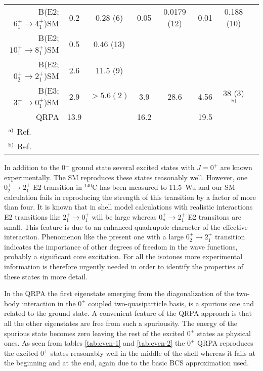 \begin{table}[htbp]
\begin{center}
\begin{tabular}{rccccccc}
B(E2;$6^{+}_{1} \rightarrow 4^{+}_{1}$)\hspace{1.cm}SM & 0.2  & 0.28 (6) & 0.05 & 
                           0.0179 (12) & 0.01 & 0.188 (10) \\
B(E2;$10^{+}_{1} \rightarrow 8^{+}_{1}$)\hspace{.85cm}SM & 0.5 & 0.46 (13) & & & & \\
B(E2;$0^{+}_{2} \rightarrow 2^{+}_{1}$)\hspace{1.cm}SM & 2.6  & 11.5 (9) & & & & \\
B(E3;$3^{-}_{1} \rightarrow 0^{+}_{1}$)\hspace{1.cm}SM & 2.9 & $> 5.6 (2)$ & 3.9 & 28.6 & 4.56
                             & 38 (3)$^{\,{\rm b})}$ \\
                            QRPA & 13.9 & & 16.2 & & 19.5 & \\  
\hline
\multicolumn{1}{l}{$^{{\rm a)}}$ {Ref.\ \cite{gvb90}}} & & & & & \\
\multicolumn{1}{l}{$^{{\rm b)}}$ {Ref.\ \cite{bbd89}}} & & & & & \\
\end{tabular}
\label{tab:even-e2-1}
\end{center}
\end{table}

In addition to the 0$^{+}$ ground state several excited states with 
$J = 0^{+}$ are known experimentally. The SM reproduces these states 
reasonably well. However, one $0^{+}_{2}\rightarrow 2^{+}_{1}$  E2 
transition in $^{140}$C  has been measured 
to 11.5~Wu and our  SM calculation fails in reproducing the strength of this
transition by a factor of more than four.
It is known that in shell model calculations with realistic interactions
E2 transitions like 
$2^{+}_{1} \rightarrow 0^{+}_{1}$ will be large whereas  
$0^{+}_{n} \rightarrow 2^{+}_{1}$ E2 transitons are small. This feature is 
due to an  enhanced quadrupole character of the effective interaction. Phenomenon like the present
one with a large $0^{+}_{2} \rightarrow 2^{+}_{1}$ transition indicates
the importance of other degrees of freedom in the wave functions, probably a significant
core excitation. For all the isotones more experimental information is therefore urgently
needed in order to identify the properties of these states in more detail. 

In the QRPA the first eigenstate
emerging from the diagonalization of the two-body interaction in
the $0^+$ coupled two-quasiparticle basis, is a spurious one \cite{bar60} and
related to the ground state. A convenient feature of the QRPA approach is that 
all the other eigenstates are free from such a spuriousity. 
The energy of the spurious state becomes zero leaving the rest of the 
excited $0^+$ states as physical ones. As seen from tables
\ref{tab:even-1} and \ref{tab:even-2} the $0^+$ 
QRPA reproduces the excited $0^{+}$ states  reasonably well in the middle of the shell
whereas it fails at the beginning and at the end, again due to the basic
BCS approximation used.

